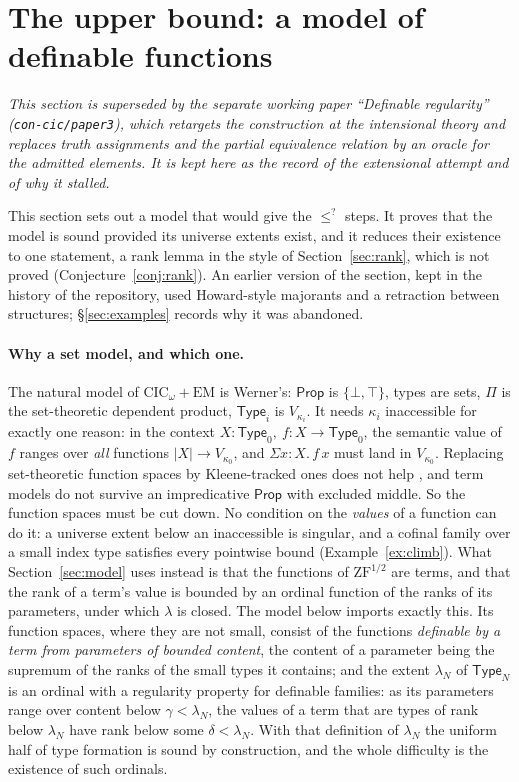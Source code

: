 \documentclass[10pt]{article}
\newcommand{\Prop}{\mathsf{Prop}}
\newcommand{\Type}{\mathsf{Type}}
\newcommand{\CIC}{\mathrm{CIC}}
\newcommand{\ZFh}{\mathrm{ZF}^{1/2}}
\newcommand{\EM}{\mathrm{EM}}
\begin{document}
\section{The upper bound: a model of definable functions}\label{sec:upper}

\emph{This section is superseded by the separate working paper
``Definable regularity'' (\texttt{con-cic/paper3}), which retargets the
construction at the intensional theory and replaces truth assignments
and the partial equivalence relation by an oracle for the admitted
elements. It is kept here as the record of the extensional attempt and
of why it stalled.}

This section sets out a model that would give the $\le^{?}$ steps. It
proves that the model is sound provided its universe extents exist, and
it reduces their existence to one statement, a rank lemma in the style
of Section~\ref{sec:rank}, which is not proved
(Conjecture~\ref{conj:rank}). An earlier version of the section, kept in
the history of the repository, used Howard-style majorants and a
retraction between structures; \S\ref{sec:examples} records why it was
abandoned.

\paragraph{Why a set model, and which one.}
The natural model of $\CIC_\omega+\EM$ is Werner's: $\Prop$ is
$\{\bot,\top\}$, types are sets, $\Pi$ is the set-theoretic dependent
product, $\Type_i$ is $V_{\kappa_i}$. It needs $\kappa_i$ inaccessible
for exactly one reason: in the context $X{:}\Type_0,\ f{:}X\to\Type_0$,
the semantic value of $f$ ranges over \emph{all} functions
$|X|\to V_{\kappa_0}$, and $\Sigma x{:}X.\,f\,x$ must land in
$V_{\kappa_0}$. Replacing set-theoretic function spaces by Kleene-tracked
ones does not help \cite[Prop.~4.4]{paper1}, and term models do not
survive an impredicative $\Prop$ with excluded middle. So the function
spaces must be cut down. No condition on the \emph{values} of a function
can do it: a universe extent below an inaccessible is singular, and a
cofinal family over a small index type satisfies every pointwise bound
(Example~\ref{ex:climb}). What Section~\ref{sec:model} uses instead is
that the functions of $\ZFh$ are terms, and that the rank of a term's
value is bounded by an ordinal function of the ranks of its parameters,
under which $\lambda$ is closed. The model below imports exactly this.
Its function spaces, where they are not small, consist of the functions
\emph{definable by a term from parameters of bounded content}, the
content of a parameter being the supremum of the ranks of the small
types it contains; and the extent $\lambda_N$ of $\Type_N$ is an ordinal
with a regularity property for definable families: as its parameters
range over content below $\gamma<\lambda_N$, the values of a term that
are types of rank below $\lambda_N$ have rank below some
$\delta<\lambda_N$. With that definition of $\lambda_N$ the uniform
half of type formation is sound by construction, and the whole
difficulty is the existence of such ordinals.
\end{document}
